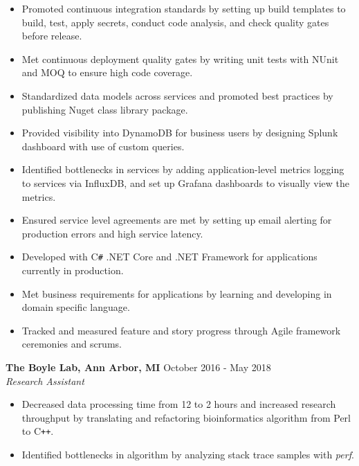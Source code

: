 \documentclass[overlapped]{res}
\begin{document}
\begin{resume}
\begin{itemize}
    \item Promoted continuous integration standards by setting up build templates to build,
    test, apply secrets, conduct code analysis,
    and check quality gates before release.

    \item Met continuous deployment quality gates by writing unit tests
    with NUnit and MOQ to ensure high code coverage.

    \item Standardized data models across services
    and promoted best practices
    by publishing Nuget class library package.

    \item Provided visibility into DynamoDB for business users
    by designing Splunk dashboard with use of
    custom queries.

    \item Identified bottlenecks in services by adding application-level
    metrics logging to services via InfluxDB,
    and set up Grafana dashboards to visually view the metrics.

    \item Ensured service level agreements are met by setting up email alerting 
    for production errors and high service latency.

    \item Developed with C\texttt{\#} .NET Core and .NET Framework
    for applications currently in production.

    \item Met business requirements for applications by learning
    and developing in domain specific language.

    \item Tracked and measured feature and story progress through
    Agile framework ceremonies and scrums.

\end{itemize}

\textbf{The Boyle Lab, Ann Arbor, MI}
\hfill October 2016 - May 2018 \\
{\sl Research Assistant}
    \begin{itemize}  \itemsep -2pt %
    \item Decreased data processing time from 12 to 2 hours 
    and increased research throughput
    by translating and refactoring bioinformatics algorithm 
    from Perl to C\texttt{++}.
    
    \item Identified bottlenecks in algorithm by analyzing stack trace samples with \textit{perf}.
    

\end{itemize}
\end{resume}
\end{document}
